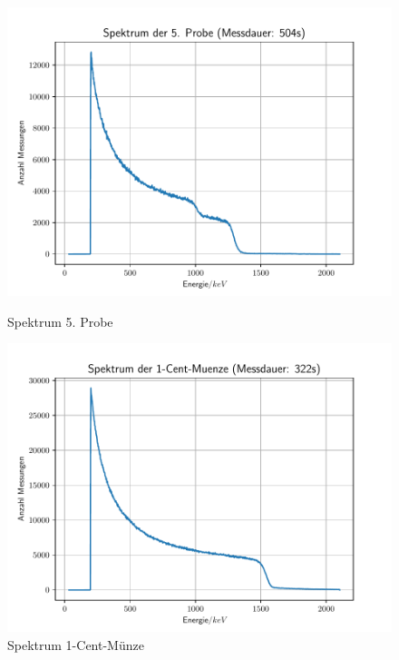 \begin{figure}[htbp] 
	\begin{minipage}[t]{0.45\linewidth} 
     \includegraphics[scale=0.5]{5Probe.pdf}
  \caption{Spektrum 5. Probe}
  \label{Probe51}
\end{minipage}
\hfill
\begin{minipage}[t]{0.45\linewidth}  
     \includegraphics[scale=0.5]{1-Cent-Muenze.pdf}
  \caption{Spektrum 1-Cent-Münze}
  \label{Münze1}
\end{minipage}
\end{figure}
